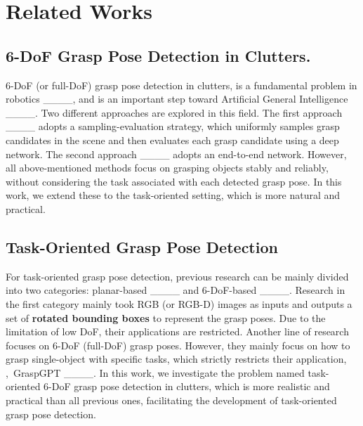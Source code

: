 \section{Related Works}
\subsection{6-DoF Grasp Pose Detection in Clutters.}
6-DoF (or full-DoF) grasp pose detection in clutters, is a fundamental problem in robotics ____, and is an important step toward Artificial General Intelligence ____. 
Two different approaches are explored in this field. 
The first approach ____ adopts a sampling-evaluation strategy, which uniformly samples grasp candidates in the scene and then evaluates each grasp candidate using a deep network. 
The second approach ____ adopts an end-to-end network. 
However, all above-mentioned methods focus on grasping objects stably and reliably, without considering the task associated with each detected grasp pose. In this work, we extend these to the task-oriented setting, which is more natural and practical.
\subsection{Task-Oriented Grasp Pose Detection}
For task-oriented grasp pose detection, previous research can be mainly divided into two categories: planar-based ____ and 6-DoF-based ____. 
Research in the first category mainly took RGB (or RGB-D) images as inputs and outputs a set of \textbf{rotated bounding boxes} to represent the grasp poses. 
Due to the limitation of low DoF, their applications are restricted. 
Another line of research focuses on 6-DoF (full-DoF) grasp poses. 
However, they mainly focus on how to grasp single-object with specific tasks, which strictly restricts their application, \eg,~GraspGPT ____. 
In this work, we investigate the problem named task-oriented 6-DoF grasp pose detection in clutters, which is more realistic and practical than all previous ones, facilitating the development of task-oriented grasp pose detection. 
